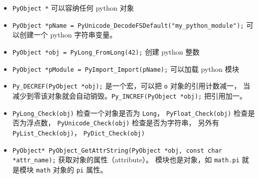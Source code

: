 

\begin{itemize}
\item \verb`PyObject *` 可以容纳任何 python 对象
\item \verb`PyObject *pName = PyUnicode_DecodeFSDefault("my_python_module");` 可以创建一个 python 字符串变量。
\item \verb`PyObject *obj = PyLong_FromLong(42);` 创建 python 整数
\item \verb`PyObject *pModule = PyImport_Import(pName);` 可以加载 python 模块
\item \verb`Py_DECREF(PyObject *obj);` 是一个宏，可以把 \verb`o` 对象的引用计数减一， 当减少到零该对象就会自动销毁。\verb`Py_INCREF(PyObject *obj);` 把引用加一。
\item \verb`PyLong_Check(obj)` 检查一个对象是否为 \verb`Long`， \verb`PyFloat_Check(obj)` 检查是否为浮点数， \verb`PyUnicode_Check(obj)` 检查是否为字符串， 另外有 \verb`PyList_Check(obj)`， \verb`PyDict_Check(obj)`
\item \verb`PyObject* PyObject_GetAttrString(PyObject *obj, const char *attr_name);` 获取对象的属性（attribute）。 模块也是对象，如 \verb`math.pi` 就是模块 \verb`math` 对象的 \verb`pi` 属性。
\end{itemize}
